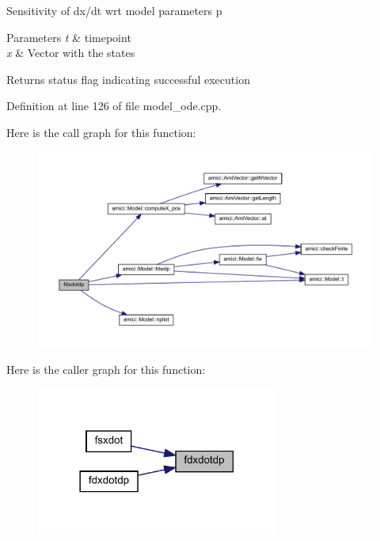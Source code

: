 Sensitivity of dx/dt wrt model parameters p 
\begin{DoxyParams}{Parameters}
{\em t} & timepoint \\
\hline
{\em x} & Vector with the states \\
\hline
\end{DoxyParams}
\begin{DoxyReturn}{Returns}
status flag indicating successful execution 
\end{DoxyReturn}


Definition at line 126 of file model\+\_\+ode.\+cpp.

Here is the call graph for this function\+:
\nopagebreak
\begin{figure}[H]
\begin{center}
\leavevmode
\includegraphics[width=350pt]{classamici_1_1_model___o_d_e_a371aa66b99b1b3b20ed2e533d9b44870_cgraph}
\end{center}
\end{figure}
Here is the caller graph for this function\+:
\nopagebreak
\begin{figure}[H]
\begin{center}
\leavevmode
\includegraphics[width=225pt]{classamici_1_1_model___o_d_e_a371aa66b99b1b3b20ed2e533d9b44870_icgraph}
\end{center}
\end{figure}
\mbox{\label{classamici_1_1_model___o_d_e_afd60580b84c72713288796453f6da33a}} 
